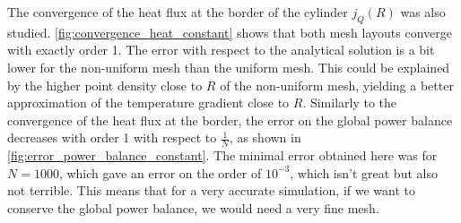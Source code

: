 The convergence of the heat flux at the border of the cylinder \(j_Q(R)\) was also studied. \autoref{fig:convergence_heat_constant} shows that both mesh layouts converge with exactly order 1. The error with respect to the analytical solution is a bit lower for the non-uniform mesh than the uniform mesh. This could be explained by the higher point density close to \(R\) of the non-uniform mesh, yielding a better approximation of the temperature gradient close to \(R\). Similarly to the convergence of the heat flux at the border, the error on the global power balance decreases with order 1 with respect to \(\frac{1}{N}\), as shown in \autoref{fig:error_power_balance_constant}. The minimal error obtained here was for \(N = 1000\), which gave an error on the order of \(10^{-3}\), which isn't great but also not terrible. This means that for a very accurate simulation, if we want to conserve the global power balance, we would need a very fine mesh.

